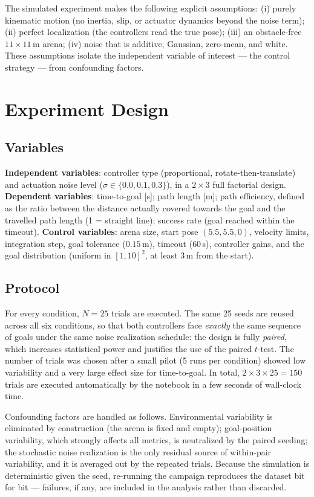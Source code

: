 \documentclass[conference]{IEEEtran}
\begin{document}
The simulated experiment makes the following explicit assumptions: (i) purely
kinematic motion (no inertia, slip, or actuator dynamics beyond the noise
term); (ii) perfect localization (the controllers read the true pose);
(iii) an obstacle-free $11\times11$\,m arena; (iv) noise that is additive,
Gaussian, zero-mean, and white. These assumptions isolate the independent
variable of interest --- the control strategy --- from confounding factors.

\section{Experiment Design}
\subsection{Variables}
\textbf{Independent variables}: controller type (proportional,
rotate-then-translate) and actuation noise level
($\sigma\in\{0.0,0.1,0.3\}$), in a $2\times3$ full factorial design.
\textbf{Dependent variables}: time-to-goal [s]; path length [m]; path
efficiency, defined as the ratio between the distance actually covered
towards the goal and the travelled path length (1 = straight line); success
rate (goal reached within the timeout). \textbf{Control variables}: arena
size, start pose $(5.5,5.5,0)$, velocity limits, integration step, goal
tolerance ($0.15$\,m), timeout ($60$\,s), controller gains, and the goal
distribution (uniform in $[1,10]^2$, at least $3$\,m from the start).

\subsection{Protocol}
For every condition, $N=25$ trials are executed. The same 25 seeds are reused
across all six conditions, so that both controllers face \emph{exactly} the
same sequence of goals under the same noise realization schedule: the design
is fully \emph{paired}, which increases statistical power and justifies the
use of the paired $t$-test. The number of trials was chosen after a small
pilot (5 runs per condition) showed low variability and a very large effect
size for time-to-goal. In total, $2\times3\times25=150$ trials are executed
automatically by the notebook in a few seconds of wall-clock time.

Confounding factors are handled as follows. Environmental variability is
eliminated by construction (the arena is fixed and empty); goal-position
variability, which strongly affects all metrics, is neutralized by the paired
seeding; the stochastic noise realization is the only residual source of
within-pair variability, and it is averaged out by the repeated trials.
Because the simulation is deterministic given the seed, re-running the
campaign reproduces the dataset bit for bit --- failures, if any, are included
in the analysis rather than discarded.
\end{document}
